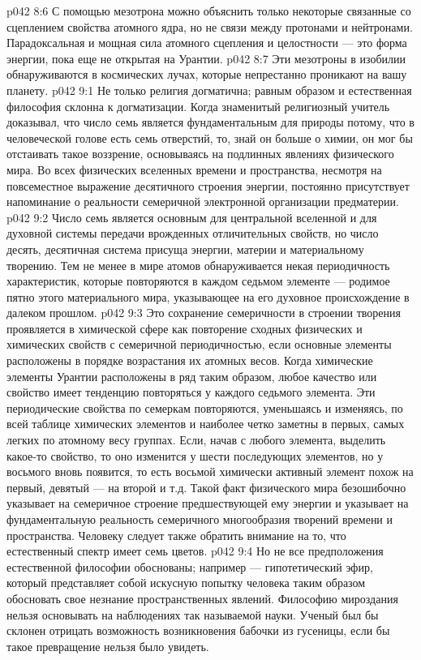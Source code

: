 \vs p042 8:6 С помощью мезотрона можно объяснить только некоторые связанные со сцеплением свойства атомного ядра, но не связи между протонами и нейтронами. Парадоксальная и мощная сила атомного сцепления и целостности --- это форма энергии, пока еще не открытая на Урантии.
\vs p042 8:7 Эти мезотроны в изобилии обнаруживаются в космических лучах, которые непрестанно проникают на вашу планету.
\vs p042 9:1 Не только религия догматична; равным образом и естественная философия склонна к догматизации. Когда знаменитый религиозный учитель доказывал, что число семь является фундаментальным для природы потому, что в человеческой голове есть семь отверстий, то, знай он больше о химии, он мог бы отстаивать такое воззрение, основываясь на подлинных явлениях физического мира. Во всех физических вселенных времени и пространства, несмотря на повсеместное выражение десятичного строения энергии, постоянно присутствует напоминание о реальности семеричной электронной организации предматерии.
\vs p042 9:2 Число семь является основным для центральной вселенной и для духовной системы передачи врожденных отличительных свойств, но число десять, десятичная система присуща энергии, материи и материальному творению. Тем не менее в мире атомов обнаруживается некая периодичность характеристик, которые повторяются в каждом седьмом элементе --- родимое пятно этого материального мира, указывающее на его духовное происхождение в далеком прошлом.
\vs p042 9:3 Это сохранение семеричности в строении творения проявляется в химической сфере как повторение сходных физических и химических свойств с семеричной периодичностью, если основные элементы расположены в порядке возрастания их атомных весов. Когда химические элементы Урантии расположены в ряд таким образом, любое качество или свойство имеет тенденцию повторяться у каждого седьмого элемента. Эти периодические свойства по семеркам повторяются, уменьшаясь и изменяясь, по всей таблице химических элементов и наиболее четко заметны в первых, самых легких по атомному весу группах. Если, начав с любого элемента, выделить какое\hyp{}то свойство, то оно изменится у шести последующих элементов, но у восьмого вновь появится, то есть восьмой химически активный элемент похож на первый, девятый --- на второй и т.д. Такой факт физического мира безошибочно указывает на семеричное строение предшествующей ему энергии и указывает на фундаментальную реальность семеричного многообразия творений времени и пространства. Человеку следует также обратить внимание на то, что естественный спектр имеет семь цветов.
\vs p042 9:4 Но не все предположения естественной философии обоснованы; например --- гипотетический эфир, который представляет собой искусную попытку человека таким образом обосновать свое незнание пространственных явлений. Философию мироздания нельзя основывать на наблюдениях так называемой науки. Ученый был бы склонен отрицать возможность возникновения бабочки из гусеницы, если бы такое превращение нельзя было увидеть.
